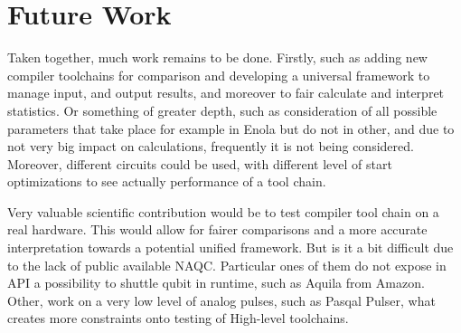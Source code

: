 
\chapter{Future Work}\label{chapter:futurework}
Taken together, much work remains to be done. 
Firstly, such as adding new compiler toolchains for comparison 
and developing a universal framework to manage input, 
and output results, and moreover to fair calculate and interpret statistics.
Or something of greater depth, 
such as consideration of all possible parameters that take place for example in Enola but do not in other,
and due to not very big impact on calculations, frequently it is not being considered.
Moreover, different circuits could be used, with different level of start optimizations to see actually performance of a tool chain.

Very valuable scientific contribution would be to test compiler tool chain on a real hardware.
This would allow for fairer comparisons and a more accurate interpretation towards a potential unified framework.
But is it a bit difficult due to the lack of public available \ac{NAQC}. 
Particular ones of them do not expose in API a possibility to shuttle qubit in runtime, such as Aquila from Amazon.
Other, work on a very low level of analog pulses, such as Pasqal Pulser, what creates more constraints onto testing of High-level toolchains.